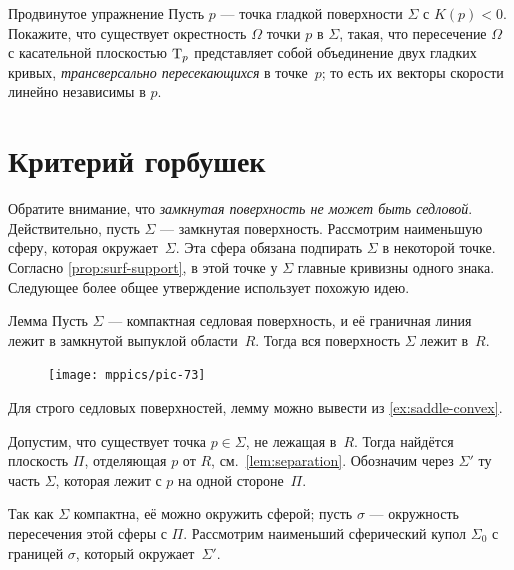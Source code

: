 \begin{thm}{Продвинутое упражнение}\label{ex:crosss}
Пусть $p$ --- точка гладкой поверхности $\Sigma$ с $K(p)<0$.
Покажите, что существует окрестность $\Omega$ точки $p$ в $\Sigma$,
такая, что пересечение $\Omega$ с касательной плоскостью $\mathrm{T}_p$ представляет собой объединение двух гладких кривых, \emph{трансверсально пересекающихся} в точке~$p$;
то есть их векторы скорости линейно независимы в $p$.
\end{thm}



\section{Критерий горбушек}

Обратите внимание, что \textit{замкнутая поверхность не может быть седловой}.
Действительно, пусть $\Sigma$ --- замкнутая поверхность.
Рассмотрим наименьшую сферу, которая окружает~$\Sigma$.
Эта сфера обязана подпирать $\Sigma$ в некоторой точке.
Согласно \ref{prop:surf-support}, в этой точке у $\Sigma$ главные кривизны одного знака.
Следующее более общее утверждение использует похожую идею.

\begin{thm}{Лемма}\label{lem:convex-saddle}
Пусть $\Sigma$ --- компактная седловая поверхность, и её граничная линия лежит в замкнутой выпуклой области~$R$.
Тогда вся поверхность $\Sigma$ лежит в~$R$.
\end{thm}

{

\begin{figure}
\vskip-8mm
\centering
\texttt{[image: mppics/pic-73]}
\vskip-4mm
\end{figure}

Для строго седловых поверхностей, лемму можно вывести из \ref{ex:saddle-convex}.

Допустим, что существует точка $p\in \Sigma$,  не лежащая в~$R$.
Тогда найдётся плоскость $\Pi$, отделяющая $p$ от $R$, см.~\ref{lem:separation}.
Обозначим через $\Sigma'$ ту часть $\Sigma$, которая лежит с $p$ на одной стороне~$\Pi$.

}

Так как $\Sigma$ компактна, её можно окружить сферой;
пусть $\sigma$ --- окружность пересечения этой сферы с $\Pi$.
Рассмотрим наименьший сферический купол $\Sigma_0$ с границей $\sigma$, который окружает~$\Sigma'$.

